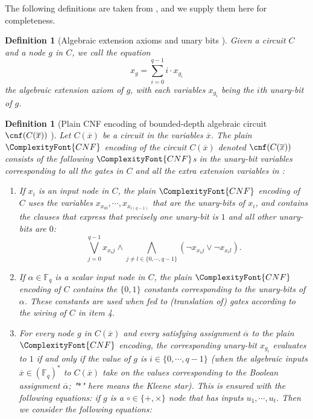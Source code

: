 \documentclass[11pt,letter]{article}
\newtheorem{definition}[theorem]{Definition}
\theoremstyle{remark} %
\newcommand{\CNF}{ %
    {
        \ComplexityFont{CNF}
    }
}
\begin{document}
{    The following definitions are taken from \cite{ST25}, and we supply them here for completeness. 
    \begin{definition}[Algebraic extension axioms and unary bits \cite{ST25}] 
        \label{def: algebraic extension axioms and unary bits}
        Given a circuit $C$ and a node $g$ in $C$, we call the equation
        \begin{equation*}
            x_g = \sum_{i=0}^{q-1} i \cdot x_{g_i}
        \end{equation*}
        the algebraic extension axiom of $g$, with each variables $x_{g_i}$ being the $i$th unary-bit of $g$.
    \end{definition}
    
    \begin{definition}[Plain CNF encoding of bounded-depth algebraic circuit $\cnf(C(\overline{x}))$ \cite{ST25}]
        \label{def: plain CNF encoding of constant-depth algebraic circuit cnf(C(x))}
        Let $C(\overline{x})$ be a circuit in the variables $\overline{x}$. The plain $\CNF$ encoding of the circuit $C(\overline{x})$ denoted $\cnf(C(\overline{x}))$ consists of the following $\CNF$s in the unary-bit variables corresponding to   all the gates in $C$ and all the extra extension variables in :
        \begin{enumerate}
            \item If $x_i$ is an input node in $C$, the plain $\CNF$ encoding of $C$ uses the variables $x_{x_{i0}},\cdots,x_{x_{i(q-1)}}$ that are the unary-bits of $x_i$, and contains the clauses that express that precisely one unary-bit is $1$ and all other unary-bits are $0$:
            \begin{equation*}
                    \bigvee_{j=0}^{q-1} x_{x_i j} \land \bigwedge_{j \neq l \in \{0,\cdots,q-1\}} (\neg x_{x_i j} \lor \neg x_{x_i l}).
            \end{equation*}
            \item If $\alpha \in \mathbb{F}_q$ is a scalar input node in $C$, the plain $\CNF$ encoding of $C$ contains the $\{0,1\}$ constants  corresponding to the unary-bits of $\alpha$. These constants are used when fed to (translation of) gates according to the wiring of $C$ in item 4.
            \item \label{it:1914} For every node $g$ in $C(\overline{x})$ and every satisfying assignment $\overline{\alpha}$ to the plain $\CNF$ encoding, the corresponding unary-bit $x_{g_i}$ evaluates to $1$ if and only if the value of $g$ is $i \in \{0,\cdots, q-1\}$ (when the algebraic inputs $\overline{x} \in (\mathbb{F}_q)^\ast$ to $C(\overline{x})$ take on the values corresponding to the Boolean assignment $\overline{\alpha}$; "$\ast$" here means the Kleene star). This is ensured with the following equations: if $g$ is a $\circ \in \{+, \times\}$ node that has inputs $u_1,\cdots, u_t$. Then we consider the following equations:

\end{enumerate}
\end{definition}}
\end{document}
